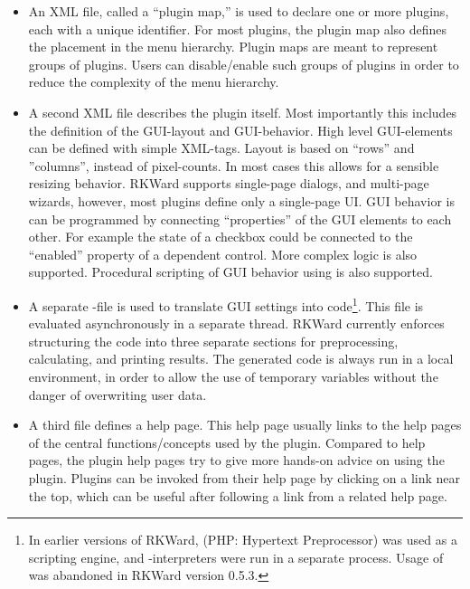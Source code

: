 \begin{itemize}
    \item
    An XML file, called a ``plugin map,'' is used to declare one or more plugins, each
    with a unique identifier. For most plugins, the plugin map also defines the
    placement in the menu hierarchy. Plugin maps are meant to represent groups of
    plugins. Users can disable/enable such groups of plugins in order to reduce the
    complexity of the menu hierarchy.

    \item
    A second XML file describes the plugin itself. Most importantly this includes
    the definition of the GUI-layout and GUI-behavior. High level GUI-elements can
    be defined with simple XML-tags. Layout is based on ``rows'' and ''columns'',
    instead of pixel-counts. In most cases this allows for a sensible resizing
    behavior. RKWard supports single-page dialogs, and multi-page wizards, however,
    most plugins define only a single-page UI. GUI behavior is can be programmed by
    connecting ``properties'' of the GUI elements to each other. For example the state
    of a checkbox could be connected to the ``enabled'' property of a dependent
    control. More complex logic is also supported. Procedural scripting of GUI
    behavior using  is also supported.

    \item
    A separate -file is used to translate GUI settings into 
    code\footnote{
        In earlier versions of RKWard,  (PHP: Hypertext Preprocessor) was used
        as a scripting engine, and -interpreters were run in a separate process.
        Usage of  was abandoned in RKWard version 0.5.3.
    }. This  file is evaluated asynchronously in a separate thread. RKWard
    currently enforces structuring the code into three separate sections for
    preprocessing, calculating, and printing results. The generated code is always
    run in a local environment, in order to allow the use of temporary variables
    without the danger of overwriting user data.

    \item
    A third  file defines a help page. This help page usually links to the  help
    pages of the central functions/concepts used by the plugin. Compared to  help
    pages, the plugin help pages try to give more hands-on advice on using the
    plugin. Plugins can be invoked from their help page by clicking on a link near
    the top, which can be useful after following a link from a related help page.
\end{itemize}

